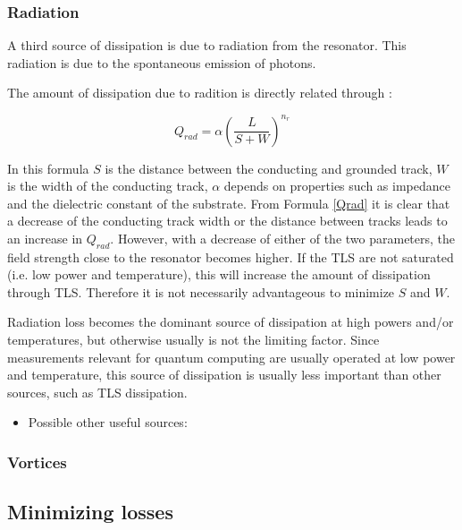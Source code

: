 \documentclass[12pt]{report}
\begin{document}
\subsubsection{Radiation}

A third source of dissipation is due to radiation from the resonator. This radiation is due to the spontaneous emission of photons.

The amount of dissipation due to radition is directly related through \cite{sage2011study,Mazin}:

\begin{equation}
    Q_{rad} = \alpha \left( \frac{L}{ S + W}\right)^{n_r}
    \label{Qrad}
\end{equation}

In this formula $S$ is the distance between the conducting and grounded track, $W$ is the width of the conducting track, $\alpha$ depends on properties such as impedance and the dielectric constant of the substrate. From Formula \ref{Qrad} it is clear that a decrease of the conducting track width or the distance between tracks leads to an increase in $Q_{rad}$. However, with a decrease of either of the two parameters, the field strength close to the resonator becomes higher. If the TLS are not saturated (i.e. low power and temperature), this will increase the amount of dissipation through TLS. Therefore it is not necessarily advantageous to minimize $S$ and $W$.

Radiation loss becomes the dominant source of dissipation at high powers and/or temperatures, but otherwise usually is not the limiting factor. Since measurements relevant for quantum computing are usually operated at low power and temperature, this source of dissipation is usually less important than other sources, such as TLS dissipation.

\begin{itemize}
    \item Possible other useful sources: \cite{denlinger1969radiation} \cite{khalil2011loss}
\end{itemize}



\subsubsection{Vortices}





\subsection{Minimizing losses}
\end{document}
